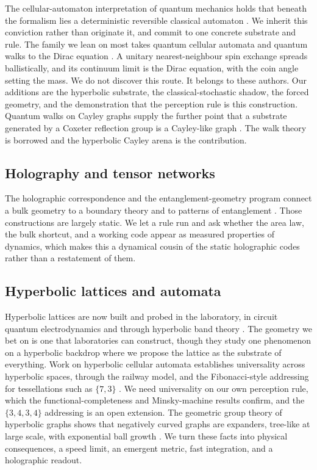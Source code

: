 The cellular-automaton interpretation of quantum mechanics holds that beneath the formalism lies a deterministic
reversible classical automaton \cite{thooft2014}. We inherit this conviction rather than originate it, and commit
to one concrete substrate and rule. The family we lean on most takes quantum cellular automata and quantum walks
to the Dirac equation \cite{dariano2014, bisio2015, bisio2016, arrighi2011, arrighi2014, farrelly2014}. A unitary
nearest-neighbour spin exchange spreads ballistically, and its continuum limit is the Dirac equation, with the
coin angle setting the mass. We do not discover this route. It belongs to these authors. Our additions are the
hyperbolic substrate, the classical-stochastic shadow, the forced geometry, and the demonstration that the
perception rule is this construction. Quantum walks on Cayley graphs supply the further point that a substrate
generated by a Coxeter reflection group is a Cayley-like graph \cite{lopezacevedo2006}. The walk theory is
borrowed and the hyperbolic Cayley arena is the contribution.

\subsection{Holography and tensor networks}

The holographic correspondence and the entanglement-geometry program connect a bulk geometry to a boundary
theory and to patterns of entanglement \cite{maldacena1998, ryu2006, vanraamsdonk2010, swingle2012, pastawski2015,
jahn2021}. Those constructions are largely static. We let a rule run and ask whether the area law, the bulk
shortcut, and a working code appear as measured properties of dynamics, which makes this a dynamical cousin of the
static holographic codes rather than a restatement of them.

\subsection{Hyperbolic lattices and automata}

Hyperbolic lattices are now built and probed in the laboratory, in circuit quantum electrodynamics and through
hyperbolic band theory \cite{kollar2019, maciejko2021}. The geometry we bet on is one that laboratories can
construct, though they study one phenomenon on a hyperbolic backdrop where we propose the lattice as the substrate
of everything. Work on hyperbolic cellular automata establishes universality across hyperbolic spaces, through the
railway model, and the Fibonacci-style addressing for tessellations such as $\{7,3\}$ \cite{margenstern2013}. We
need universality on our own perception rule, which the functional-completeness and Minsky-machine results
confirm, and the $\{3,4,3,4\}$ addressing is an open extension. The geometric group theory of hyperbolic graphs
shows that negatively curved graphs are expanders, tree-like at large scale, with exponential ball growth
\cite{cannon1997, hamann2011}. We turn these facts into physical consequences, a speed limit, an emergent metric,
fast integration, and a holographic readout.

